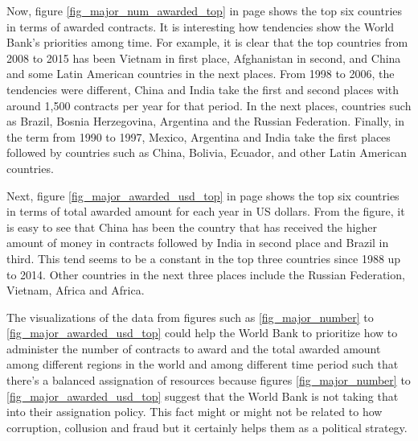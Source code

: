 Now, figure \ref{fig_major_num_awarded_top} in  page \pageref{fig_major_num_awarded_top} shows the top six countries  in terms of awarded contracts. It is interesting how tendencies show the World Bank's priorities among time. For example, it is clear that the top countries from 2008 to 2015 has been Vietnam in first place, Afghanistan in second, and China and some Latin American countries in the next places. From 1998 to 2006, the tendencies were different, China and India take the first and second places with around 1,500 contracts per year for that period. In the next places, countries such as Brazil, Bosnia Herzegovina,  Argentina and the Russian Federation. Finally, in the term from 1990 to 1997, Mexico, Argentina and India take the first places followed by countries such as China, Bolivia, Ecuador, and other Latin American countries.

Next, figure \ref{fig_major_awarded_usd_top} in page \pageref{fig_major_awarded_usd_top} shows the top six countries  in terms of total awarded amount for each year in US dollars. From the figure, it is easy to see that China has been the country that has received the higher amount of money in contracts followed by India in second place and Brazil in third. This tend seems to be a constant in the top three countries since 1988 up to 2014. Other countries in the next three places include the Russian Federation, Vietnam, Africa and Africa.

The visualizations of  the data from figures such as \ref{fig_major_number} to  \ref{fig_major_awarded_usd_top} could help the World Bank to prioritize how to administer the number of contracts to award and the total awarded amount among different regions in the world and among different time period such that there's a balanced assignation of resources because figures  \ref{fig_major_number} to  \ref{fig_major_awarded_usd_top} suggest that the World Bank is not taking that into their assignation policy. This fact might or might not be related to how corruption, collusion and fraud but it certainly helps them as a political strategy.

